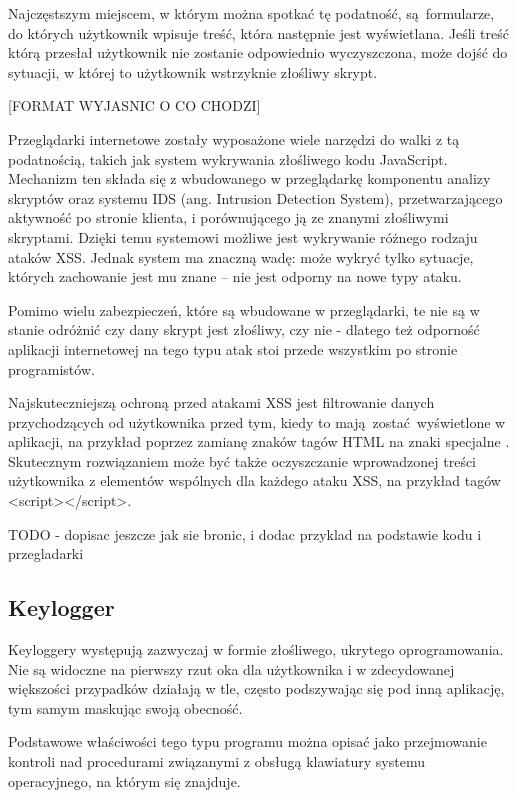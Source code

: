\documentclass[12pt,twoside]{article}
\begin{document}
{Najczęstszym miejscem, w którym można spotkać tę podatność, są formularze, do których użytkownik wpisuje treść, która następnie jest wyświetlana. Jeśli treść którą przesłał użytkownik nie zostanie odpowiednio wyczyszczona, może dojść do sytuacji, w której to użytkownik wstrzyknie złośliwy skrypt.

[FORMAT WYJASNIC O CO CHODZI]

Przeglądarki internetowe zostały wyposażone wiele narzędzi do walki z tą podatnością, takich jak system wykrywania złośliwego kodu JavaScript. Mechanizm ten składa się z wbudowanego w przeglądarkę komponentu analizy skryptów oraz systemu IDS (ang. Intrusion Detection System), przetwarzającego aktywność po stronie klienta, i porównującego ją ze znanymi złośliwymi skryptami. Dzięki temu systemowi możliwe jest wykrywanie różnego rodzaju ataków XSS. Jednak system ma znaczną wadę: może wykryć tylko sytuacje, których zachowanie jest mu znane -- nie jest odporny na nowe typy ataku. \cite{XSSProtection}

Pomimo wielu zabezpieczeń, które są wbudowane w przeglądarki, te nie są w stanie odróżnić czy dany skrypt jest złośliwy, czy nie - dlatego też odporność aplikacji internetowej na tego typu atak stoi przede wszystkim po stronie programistów.

Najskuteczniejszą ochroną przed atakami XSS jest filtrowanie danych przychodzących od użytkownika przed tym, kiedy to mają zostać wyświetlone w aplikacji, na przykład poprzez zamianę znaków tagów HTML na znaki specjalne \cite{XSSSpecialTags}. Skutecznym rozwiązaniem może być także oczyszczanie wprowadzonej treści użytkownika z elementów wspólnych dla każdego ataku XSS, na przykład tagów <script></script>.

TODO - dopisac jeszcze jak sie bronic, i dodac przyklad na podstawie kodu i przegladarki
\clearpage

\subsection{Keylogger}

Keyloggery występują zazwyczaj w formie złośliwego, ukrytego oprogramowania. Nie są widoczne na pierwszy rzut oka dla użytkownika i w zdecydowanej większości przypadków działają w tle, często podszywając się pod inną aplikację, tym samym maskując swoją obecność. 

Podstawowe właściwości tego typu programu można opisać jako przejmowanie kontroli nad procedurami związanymi z obsługą klawiatury systemu operacyjnego, na którym się znajduje.

}
\end{document}
